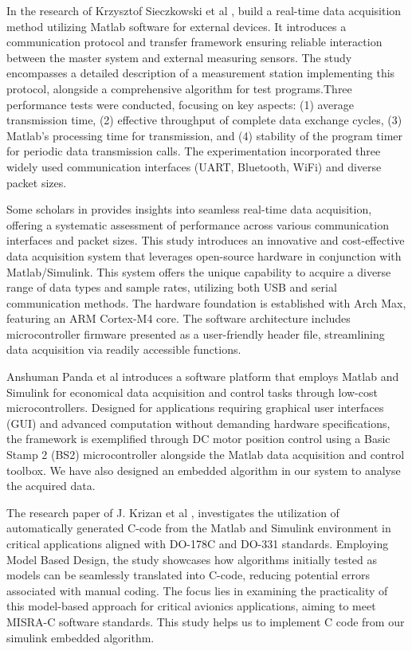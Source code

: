 \vspace{0.5cm}
In the research of Krzysztof Sieczkowski et al \textbf{\cite{RealTimeAcq_Matlab}}, build a real-time data acquisition method utilizing Matlab software for external devices. It introduces a communication protocol and transfer framework ensuring reliable interaction between the master system and external measuring sensors. The study encompasses a detailed description of a measurement station implementing this protocol, alongside a comprehensive algorithm for test programs.Three performance tests were conducted, focusing on key aspects: (1) average transmission time, (2) effective throughput of complete data exchange cycles, (3) Matlab's processing time for transmission, and (4) stability of the program timer for periodic data transmission calls. The experimentation incorporated three widely used communication interfaces (UART, Bluetooth, WiFi) and diverse packet sizes.\par
\vspace{0.5cm}
Some scholars in \textbf{\cite{OpenAcq_Matlab}} provides insights into seamless real-time data acquisition, offering a systematic assessment of performance across various communication interfaces and packet sizes. This study introduces an innovative and cost-effective data acquisition system that leverages open-source hardware in conjunction with Matlab/Simulink. This system offers the unique capability to acquire a diverse range of data types and sample rates, utilizing both USB and serial communication methods. The hardware foundation is established with Arch Max, featuring an ARM Cortex-M4 core. The software architecture includes microcontroller firmware presented as a user-friendly header file, streamlining data acquisition via readily accessible functions.
\vspace{0.5cm}

Anshuman Panda et al \textbf{\cite{Matlab_DAQ}} introduces a software platform that employs Matlab and Simulink for economical data acquisition and control tasks through low-cost microcontrollers. Designed for applications requiring graphical user interfaces (GUI) and advanced computation without demanding hardware specifications, the framework is exemplified through DC motor position control using a Basic Stamp 2 (BS2) microcontroller alongside the Matlab data acquisition and control toolbox. We have also designed an embedded algorithm in our system to analyse the acquired data.
\vspace{0.5cm}

The research paper of J. Krizan et al \textbf{\cite{Automatic_code}}, investigates the utilization of automatically generated C-code from the Matlab and Simulink environment in critical applications aligned with DO-178C and DO-331 standards. Employing Model Based Design, the study showcases how algorithms initially tested as models can be seamlessly translated into C-code, reducing potential errors associated with manual coding. The focus lies in examining the practicality of this model-based approach for critical avionics applications, aiming to meet MISRA-C software standards. This study helps us to implement C code from our simulink embedded algorithm.



